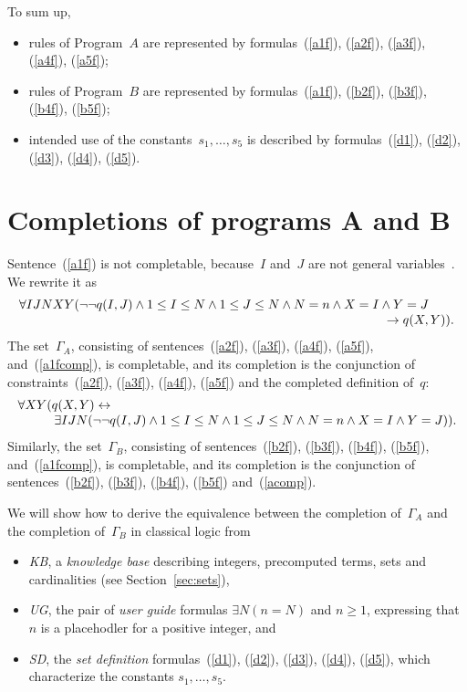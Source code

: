 \documentclass[11pt]{article}
\def\lrar{\leftrightarrow}
\def\beq{\begin{equation}}
\def\eeq#1{\label{#1}\end{equation}}
\def\ba{\begin{array}}
\def\ea{\end{array}}
\begin{document}
\begin{adjustwidth}{-1cm}{-1cm}
To sum up,
\begin{itemize}
\item rules of Program~$A$ are represented by formulas~(\ref{a1f}),
  (\ref{a2f}), (\ref{a3f}), (\ref{a4f}), (\ref{a5f});
\item rules of Program~$B$ are represented by formulas~(\ref{a1f}),
 (\ref{b2f}), (\ref{b3f}), (\ref{b4f}), (\ref{b5f});
\item intended use of the constants~$s_1,\dots,s_5$ is described by
  formulas~(\ref{d1}), (\ref{d2}), (\ref{d3}), (\ref{d4}), (\ref{d5}).
\end{itemize}

\section{Completions of programs A and B}\label{sec:comp}

Sentence~(\ref{a1f}) is not completable, because~$I$ and~$J$ are not
general variables~\cite[Section~3.1]{fan22}.  We rewrite it as
\beq
\ba r
\forall I J N X Y (\neg\neg q(I,J) \land 1\leq I \leq N \land 1 \leq J \leq N
\land N=n \land X=I \land Y=J \qquad\\
\to q(X,Y)).
\ea
\eeq{a1fcomp}
The set~$\Gamma_A$, consisting of sentences~(\ref{a2f}), (\ref{a3f}), (\ref{a4f}), (\ref{a5f}), and~(\ref{a1fcomp}), is completable, and its
completion is the conjunction of constraints~(\ref{a2f}), (\ref{a3f}),
(\ref{a4f}), (\ref{a5f}) and the completed definition of~$q$:
\beq
\ba l
\forall X Y (q(X,Y) \lrar\\ \hskip 1cm
\exists IJN
(\neg\neg q(I,J) \land 1\leq I \leq N \land 1 \leq J \leq N\land N=n
\land X=I \land Y=J)).
\ea
\eeq{acomp}
  Similarly,
the set~$\Gamma_B$, consisting of sentences~(\ref{b2f}), (\ref{b3f}),
(\ref{b4f}), (\ref{b5f}), and~(\ref{a1fcomp}), is completable, and its
completion is the conjunction of sentences~(\ref{b2f}), (\ref{b3f}),
(\ref{b4f}), (\ref{b5f}) and~(\ref{acomp}).

We will show how to derive the equivalence between the completion
of~$\Gamma_A$ and the completion of~$\Gamma_B$ in classical logic from
\begin{itemize}
\item \emph{KB}, a \emph{knowledge base} describing integers, precomputed
  terms, sets and cardinalities (see Section~\ref{sec:sets}),
\item \emph{UG}, the pair of \emph{user guide} formulas $\exists N(n=N)$
  and $n\geq 1$, expressing that~$n$ is a placehodler for a positive
  integer, and
\item \emph{SD}, the \emph{set definition} formulas~(\ref{d1}), (\ref{d2}),
  (\ref{d3}), (\ref{d4}), (\ref{d5}), which characterize the constants
  $s_1,\dots,s_5$.
\end{itemize}


\end{adjustwidth}
\end{document}

